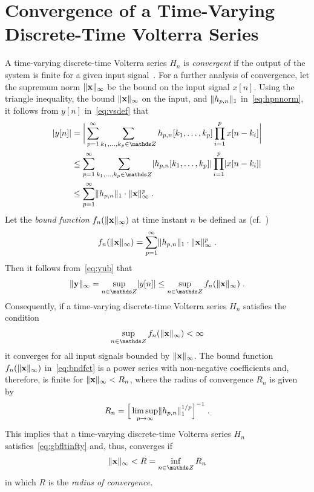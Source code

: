 \documentclass[10pt,twocolumn,twoside]{IEEEtran}
\begin{document}
\appendices


\section{Convergence of a Time-Varying\\ Discrete-Time Volterra Series}
	\label{bibo}

A time-varying discrete-time Volterra series $H_n$ is \emph{convergent}
if the output of the system is finite for a given input signal~\cite{boyd1984}. For a further
analysis of convergence, let the supremum norm $\lVert\bm{\mathrm{x}}\rVert_\infty$
be the bound on the input signal $x[n]$. Using the triangle inequality, the bound
$\lVert\bm{\mathrm{x}}\rVert_\infty$ on the input, and $\lVert h_{p,n}\rVert_1$ in~\eqref{eq:hpnnorm}, it follows
from $y[n]$ in~\eqref{eq:vsdef} that
\begin{align}
	\abs{y[n]} &= \bigg|\sum_{p=1}^\infty \sum_{k_1,\dots,k_p\in\Z}
	              h_{p,n}[k_1,\dots,k_p]\prod_{i=1}^p x[n-k_i]\bigg| \notag\\
	           &\leq \sum_{p=1}^\infty \sum_{k_1,\dots,k_p\in\Z}
	              \abs{h_{p,n}[k_1,\dots,k_p]}\prod_{i=1}^p \abs{x[n-k_i]} \notag\\
	           &\leq \sum_{p=1}^\infty \normone{h_{p,n}}\cdot\norminf{\vm{x}}^p \;.
	\label{eq:yub}
\end{align}
Let the \emph{bound function} $f_n(\lVert\bm{\mathrm{x}}\rVert_\infty)$ at time instant $n$ be defined as (cf.~\cite{boyd1984})
\begin{align}
	f_n(\lVert\bm{\mathrm{x}}\rVert_\infty) = \sum_{p=1}^\infty \lVert h_{p,n}\rVert_1\cdot\lVert\bm{\mathrm{x}}\rVert_\infty^p\;.
	\label{eq:bndfct}
\end{align}
Then it follows from~\eqref{eq:yub} that
\begin{align*}
	\norminf{\vm{y}} = \sup_{n\in\Z} \abs{y[n]}
	                 \leq \sup_{n\in\Z} f_n(\norminf{\vm{x}})\;.
\end{align*}
Consequently, if a time-varying discrete-time Volterra series $H_n$
satisfies the condition
\begin{align}
	\sup_{n\in\Z} f_n(\norminf{\vm{x}}) < \infty
	\label{eq:gbfltinfty}
\end{align}
it converges for all input signals bounded by $\lVert\bm{\mathrm{x}}\rVert_\infty$.
The bound function $f_n(\lVert\bm{\mathrm{x}}\rVert_\infty)$ in~\eqref{eq:bndfct} is a power series with non-negative coefficients
and, therefore, is finite for $\lVert\bm{\mathrm{x}}\rVert_\infty<R_n$, where the radius of
convergence $R_n$ is given by~\cite{rudin1964,boyd1984}
\begin{align*}
	R_n = \Big[ \limsup_{p\rightarrow\infty} \lVert h_{p,n}\rVert_1^{1/p} \Big]^{-1}\;.
\end{align*}
This implies that a time-varying discrete-time Volterra series $H_n$
satisfies~\eqref{eq:gbfltinfty} and, thus, converges if 
\begin{align*}
	\norminf{\vm{x}} < R = \inf_{n\in\Z} R_n
\end{align*}
in which $R$ is the \emph{radius of convergence}.
\end{document}
